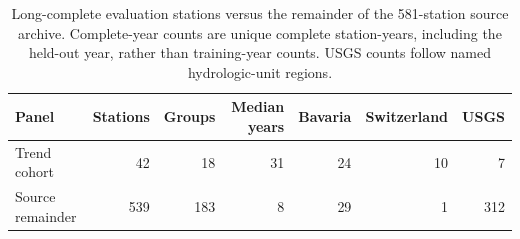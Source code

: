 \begin{table}[t]\centering\small
\caption{Long-complete evaluation stations versus the remainder of the 581-station source archive. Complete-year counts are unique complete station-years, including the held-out year, rather than training-year counts. USGS counts follow named hydrologic-unit regions.}
\label{tab:archive-comparison}
\begin{tabular}{lrrrrrr}\toprule Panel & Stations & Groups & Median years & Bavaria & Switzerland & USGS \\\midrule
Trend cohort & 42 & 18 & 31 & 24 & 10 & 7 \\
Source remainder & 539 & 183 & 8 & 29 & 1 & 312 \\
\bottomrule\end{tabular}\end{table}
